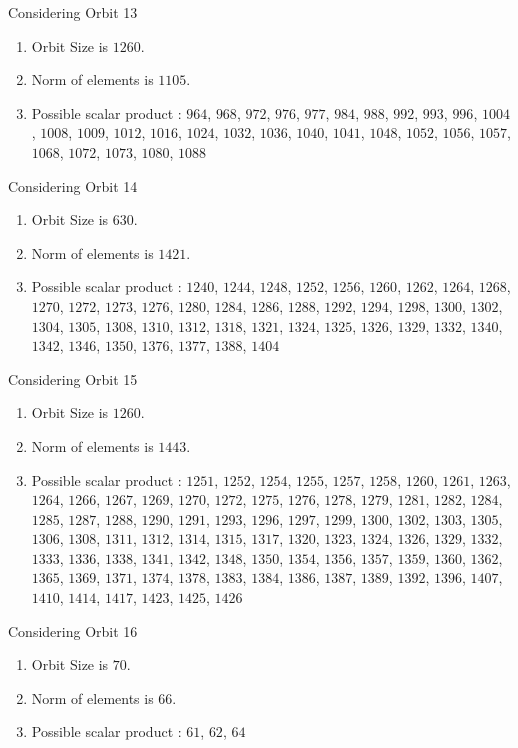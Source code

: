 \documentclass[12pt]{article}
\begin{document}
Considering Orbit 13
\begin{enumerate}
\item Orbit Size is $1260$.
\item Norm of elements is $1105$.
\item Possible scalar product : $964$, $968$, $972$, $976$, $977$, $984$, $988$, $992$, $993$, $996$, $1004$, $1008$, $1009$, $1012$, $1016$, $1024$, $1032$, $1036$, $1040$, $1041$, $1048$, $1052$, $1056$, $1057$, $1068$, $1072$, $1073$, $1080$, $1088$
\end{enumerate}
Considering Orbit 14
\begin{enumerate}
\item Orbit Size is $630$.
\item Norm of elements is $1421$.
\item Possible scalar product : $1240$, $1244$, $1248$, $1252$, $1256$, $1260$, $1262$, $1264$, $1268$, $1270$, $1272$, $1273$, $1276$, $1280$, $1284$, $1286$, $1288$, $1292$, $1294$, $1298$, $1300$, $1302$, $1304$, $1305$, $1308$, $1310$, $1312$, $1318$, $1321$, $1324$, $1325$, $1326$, $1329$, $1332$, $1340$, $1342$, $1346$, $1350$, $1376$, $1377$, $1388$, $1404$
\end{enumerate}
Considering Orbit 15
\begin{enumerate}
\item Orbit Size is $1260$.
\item Norm of elements is $1443$.
\item Possible scalar product : $1251$, $1252$, $1254$, $1255$, $1257$, $1258$, $1260$, $1261$, $1263$, $1264$, $1266$, $1267$, $1269$, $1270$, $1272$, $1275$, $1276$, $1278$, $1279$, $1281$, $1282$, $1284$, $1285$, $1287$, $1288$, $1290$, $1291$, $1293$, $1296$, $1297$, $1299$, $1300$, $1302$, $1303$, $1305$, $1306$, $1308$, $1311$, $1312$, $1314$, $1315$, $1317$, $1320$, $1323$, $1324$, $1326$, $1329$, $1332$, $1333$, $1336$, $1338$, $1341$, $1342$, $1348$, $1350$, $1354$, $1356$, $1357$, $1359$, $1360$, $1362$, $1365$, $1369$, $1371$, $1374$, $1378$, $1383$, $1384$, $1386$, $1387$, $1389$, $1392$, $1396$, $1407$, $1410$, $1414$, $1417$, $1423$, $1425$, $1426$
\end{enumerate}
Considering Orbit 16
\begin{enumerate}
\item Orbit Size is $70$.
\item Norm of elements is $66$.
\item Possible scalar product : $61$, $62$, $64$
\end{enumerate}
\end{document}
